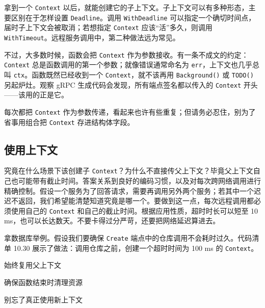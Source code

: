 拿到一个 \texttt{Context} 以后，就能创建它的子上下文。子上下文可以有多种形态，主要区别在于怎样设置 \texttt{Deadline}。调用 \texttt{WithDeadline} 可以指定一个确切时间点，届时子上下文会被取消；若想指定 \texttt{Context} 应该“活”多久，则调用 \texttt{WithTimeout}。远程服务调用中，第二种做法远为常见。

不过，大多数时候，函数会把 \texttt{Context} 作为参数接收。有一条不成文的约定：\texttt{Context} 总是函数调用的第一个参数；就像错误通常命名为 \texttt{err}，上下文也几乎总叫 \texttt{ctx}。函数既然已经收到一个 \texttt{Context}，就不该再用 \texttt{Background()} 或 \texttt{TODO()} 另起炉灶。观察 gRPC 生成代码会发现，所有端点签名都以传入的 \texttt{Context} 开头——该用的正是它。

每次都把 \texttt{Context} 作为参数传递，看起来也许有些重复；但请务必忍住，别为了省事用组合把 \texttt{Context} 存进结构体字段。

\subsection{使用上下文}

究竟在什么场景下该创建子 \texttt{Context}？为什么不直接传父上下文？毕竟父上下文自己也可能带有截止时间。答案关系到良好的编码习惯，以及对每次跨网络调用进行精确控制。假设一个服务为了回答请求，需要再调用另外两个服务；若其中一个迟迟不返回，我们希望能清楚知道究竟是哪一个。要做到这一点，每次远程调用都必须使用自己的 \texttt{Context} 和自己的截止时间。根据应用性质，超时时长可以短至 10 ms，也可以长达数天。不要卡得过分严苛，还要把网络延迟算进去。

拿数据库举例。假设我们要确保 \texttt{Create} 端点中的仓库调用不会耗时过久。代码清单 10.30 展示了做法：调用仓库之前，创建一个超时时间为 100 ms 的 \texttt{Context}。


\begin{codeannotations}
\item 始终复用父上下文
\item 确保函数结束时清理资源
\item 别忘了真正使用新上下文
\end{codeannotations}

